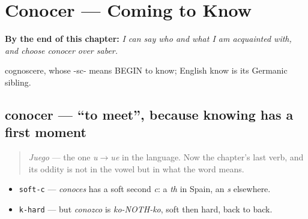 
\chapter{Conocer --- Coming to Know}
\label{ch:spanish-conocer}

\begin{chapteropening}
\textbf{By the end of this chapter:} \emph{I can say who and what I am acquainted with, and choose conocer over saber.}

cognoscere, whose -sc- means BEGIN to know; English know is its Germanic sibling.
\end{chapteropening}

\section[conocer]{conocer — \textquotedblleft{}to meet\textquotedblright{}, because knowing has a first moment}

\label{lesson:ES-C39-conocer}



\begin{quote}
\emph{Juego} — the one \emph{u$\to$ue} in the language. Now the chapter's last verb, and its oddity is not in the vowel but in what the word means.
\end{quote}

\begin{sounds}
\begin{itemize}
\raggedright
  \item \texttt{soft-c} — \emph{conoces} has a soft second \emph{c}: a \emph{th} in Spain, an \emph{s} elsewhere.
  \item \texttt{k-hard} — but \emph{conozco} is \emph{ko-NOTH-ko}, soft then hard, back to back.
\end{itemize}
\end{sounds}

